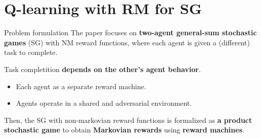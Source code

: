 \documentclass[10pt, aspectratio=169]{beamer}
\newcommand{\evidenzia}[1]{\textcolor{verdeSalvia}{\textbf{#1}}}
\begin{document}
%    

\section{Q-learning with RM for SG}


\begin{frame}{Problem formulation}
The paper focuses on \evidenzia{two-agent general-sum stochastic games} (SG) with NM reward functions, where each agent is given a (different) task to complete. 

Task completition \evidenzia{depends on the other's agent behavior}.

\begin{itemize}
    \item Each agent as a separate reward machine.
    \item Agents operate in a shared and adversarial environment.
\end{itemize}
\vspace{0.5cm}
Then, the SG with non-markovian reward functions is formalized as \evidenzia{a product stochastic game} to obtain \evidenzia{Markovian rewards} using \evidenzia{reward machines}.
\end{frame}
\end{document}
